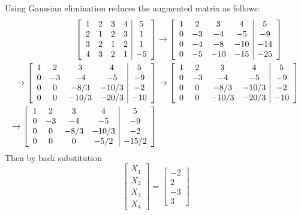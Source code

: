 \documentclass{article}
\begin{document}
\begin{solution}
Using Gaussian elimination reduces the augmented matrix as follows:
\begin{align*}
\left[
\begin{array}{c c c c | c}
1 & 2 & 3 & 4 & 5\\
2 & 1 & 2 & 3 & 1\\
3 & 2 & 1 & 2 & 1\\
4 & 3 & 2 & 1 & -5
\end{array}
\right]
&
\to\left[
\begin{array}{c c c c | c}
1 & 2 & 3 & 4 & 5\\
0 & -3 & -4 & -5 & -9\\
0 & -4 & -8 & -10 & -14\\
0 & -5 & -10 & -15 & -25
\end{array}
\right]
\\
\to\left[
\begin{array}{c c c c | c}
1 & 2 & 3 & 4 & 5\\
0 & -3 & -4 & -5 & -9\\
0 & 0 & -8/3 & -10/3 & -2\\
0 & 0 & -10/3 & -20/3 & -10
\end{array}
\right]
&
\to\left[
\begin{array}{c c c c | c}
1 & 2 & 3 & 4 & 5\\
0 & -3 & -4 & -5 & -9\\
0 & 0 & -8/3 & -10/3 & -2\\
0 & 0 & -10/3 & -20/3 & -10
\end{array}
\right]\\
\to\left[
\begin{array}{c c c c | c}
1 & 2 & 3 & 4 & 5\\
0 & -3 & -4 & -5 & -9\\
0 & 0 & -8/3 & -10/3 & -2\\
0 & 0 & 0 & -5/2 & -15/2
\end{array}
\right]
\end{align*}
Then by back substitution
\[
\begin{bmatrix}
X_{1}\\ X_{2}\\ X_{3}\\ X_{4}
\end{bmatrix}
=
\begin{bmatrix}
-2\\ 2\\ -3\\ 3
\end{bmatrix}
\]
\end{solution}
\end{document}
